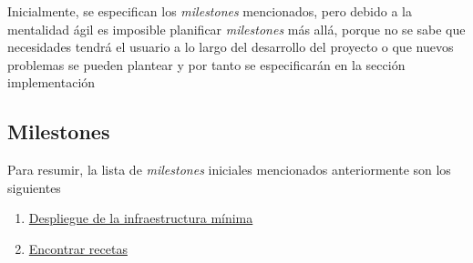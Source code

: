 Inicialmente, se especifican los \emph{milestones} mencionados, pero debido a la mentalidad ágil es imposible planificar \emph{milestones} más allá, porque no se sabe que necesidades tendrá el usuario a lo largo del desarrollo del proyecto o que nuevos problemas se pueden plantear y por tanto se especificarán en la sección implementación

\subsection{Milestones}
Para resumir, la lista de \emph{milestones} iniciales mencionados anteriormente son los siguientes\:
\begin{enumerate}
    \item \href{https://github.com/Slowmybrosh/TFG-DietPlanner/milestone/10}{Despliegue de la infraestructura mínima}
    \item \href{https://github.com/Slowmybrosh/TFG-DietPlanner/milestone/3}{Encontrar recetas}
\end{enumerate}